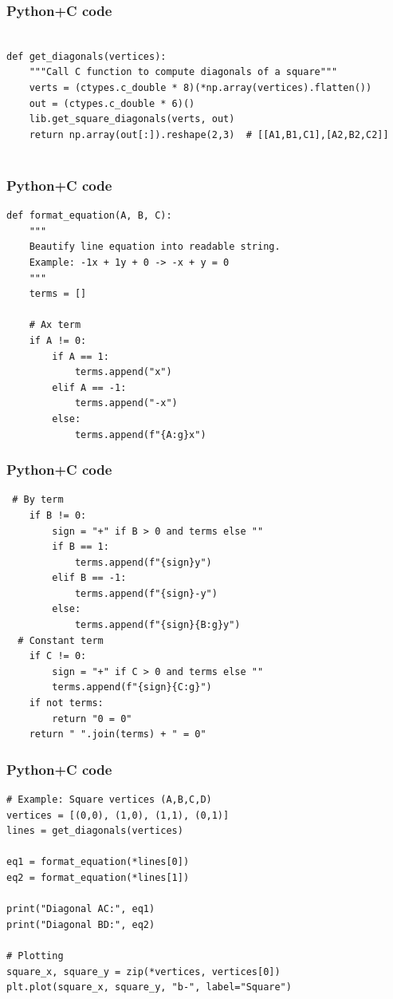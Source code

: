 \documentclass{beamer}
\begin{document}
\begin{frame}[fragile]
    \frametitle{Python+C code}

    \begin{lstlisting}

def get_diagonals(vertices):
    """Call C function to compute diagonals of a square"""
    verts = (ctypes.c_double * 8)(*np.array(vertices).flatten())
    out = (ctypes.c_double * 6)()
    lib.get_square_diagonals(verts, out)
    return np.array(out[:]).reshape(2,3)  # [[A1,B1,C1],[A2,B2,C2]]


    \end{lstlisting}
\end{frame}

\begin{frame}[fragile]
    \frametitle{Python+C code}

    \begin{lstlisting}
def format_equation(A, B, C):
    """
    Beautify line equation into readable string.
    Example: -1x + 1y + 0 -> -x + y = 0
    """
    terms = []

    # Ax term
    if A != 0:
        if A == 1:
            terms.append("x")
        elif A == -1:
            terms.append("-x")
        else:
            terms.append(f"{A:g}x")

    \end{lstlisting}
\end{frame}

\begin{frame}[fragile]
    \frametitle{Python+C code}

    \begin{lstlisting}
 # By term
    if B != 0:
        sign = "+" if B > 0 and terms else ""
        if B == 1:
            terms.append(f"{sign}y")
        elif B == -1:
            terms.append(f"{sign}-y")
        else:
            terms.append(f"{sign}{B:g}y")
  # Constant term
    if C != 0:
        sign = "+" if C > 0 and terms else ""
        terms.append(f"{sign}{C:g}")
    if not terms:
        return "0 = 0"
    return " ".join(terms) + " = 0"
    \end{lstlisting}
\end{frame}

\begin{frame}[fragile]
    \frametitle{Python+C code}

    \begin{lstlisting}
# Example: Square vertices (A,B,C,D)
vertices = [(0,0), (1,0), (1,1), (0,1)]
lines = get_diagonals(vertices)

eq1 = format_equation(*lines[0])
eq2 = format_equation(*lines[1])

print("Diagonal AC:", eq1)
print("Diagonal BD:", eq2)

# Plotting
square_x, square_y = zip(*vertices, vertices[0])
plt.plot(square_x, square_y, "b-", label="Square")
    \end{lstlisting}
\end{frame}
\end{document}
